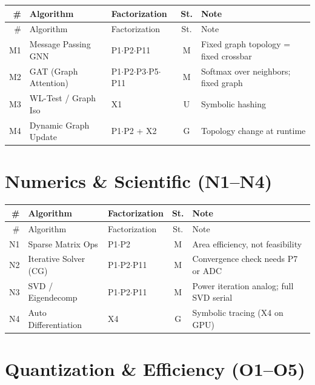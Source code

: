 \documentclass[10pt]{article}
\begin{document}
\begin{longtable}{rlp{3.0cm}cp{4.8cm}}
\toprule
\# & Algorithm & Factorization & St. & Note \\
\midrule
\endfirsthead
\toprule
\# & Algorithm & Factorization & St. & Note \\
\midrule
\endhead
\bottomrule
\endfoot
M1 & Message Passing GNN & P1$\cdot$P2$\cdot$P11 & M & Fixed graph topology = fixed crossbar \\
M2 & GAT (Graph Attention) & P1$\cdot$P2$\cdot$P3$\cdot$P5$\cdot$P11 & M & Softmax over neighbors; fixed graph \\
M3 & WL-Test / Graph Iso & X1 & U & Symbolic hashing \\
M4 & Dynamic Graph Update & P1$\cdot$P2 + X2 & G & Topology change at runtime \\
\end{longtable}

\section{Numerics \& Scientific (N1--N4)}

\begin{longtable}{rlp{3.0cm}cp{4.8cm}}
\toprule
\# & Algorithm & Factorization & St. & Note \\
\midrule
\endfirsthead
\toprule
\# & Algorithm & Factorization & St. & Note \\
\midrule
\endhead
\bottomrule
\endfoot
N1 & Sparse Matrix Ops & P1$\cdot$P2 & M & Area efficiency, not feasibility \\
N2 & Iterative Solver (CG) & P1$\cdot$P2$\cdot$P11 & M & Convergence check needs P7 or ADC \\
N3 & SVD / Eigendecomp & P1$\cdot$P2$\cdot$P11 & M & Power iteration analog; full SVD serial \\
N4 & Auto Differentiation & X4 & G & Symbolic tracing (X4 on GPU) \\
\end{longtable}

\section{Quantization \& Efficiency (O1--O5)}
\end{document}
